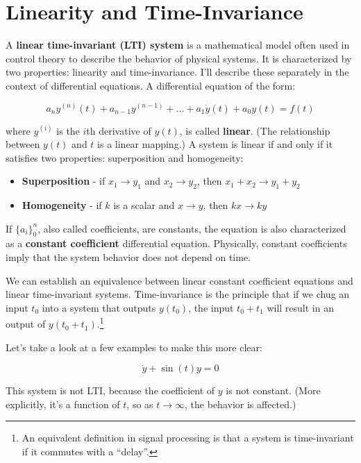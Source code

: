 \documentclass[
  letterpaper,
  DIV=11,
  numbers=noendperiod]{scrreprt}
\providecommand{\tightlist}{%
  \setlength{\itemsep}{0pt}\setlength{\parskip}{0pt}}\usepackage{longtable,booktabs,array}
\begin{document}
\hypertarget{linearity-and-time-invariance}{%
\section{Linearity and
Time-Invariance}\label{linearity-and-time-invariance}}

A \textbf{linear time-invariant (LTI) system} is a mathematical model
often used in control theory to describe the behavior of physical
systems. It is characterized by two properties: linearity and
time-invariance. I'll describe these separately in the context of
differential equations. A differential equation of the form:

\[a_n y^{(n)} (t) + a_{n-1} y^{(n-1)} + ... + a_1 \dot{y}(t) + a_0 y(t) = f(t)\]

where \(y^{(i)}\) is the \(i\)th derivative of \(y(t)\), is called
\textbf{linear}. (The relationship between \(y(t)\) and \(t\) is a
linear mapping.) A system is linear if and only if it satisfies two
properties: superposition and homogeneity:

\begin{itemize}
\tightlist
\item
  \textbf{Superposition} - if \(x_1 \to y_1\) and \(x_2 \to y_2\), then
  \(x_1 + x_2 \to y_1 + y_2\)
\item
  \textbf{Homogeneity} - if \(k\) is a scalar and \(x \to y\), then
  \(kx \to ky\)
\end{itemize}

If \(\{a_i\}_0^n\), also called coefficients, are constants, the
equation is also characterized as a \textbf{constant coefficient}
differential equation. Physically, constant coefficients imply that the
system behavior does not depend on time.

We can establish an equivalence between linear constant coefficient
equations and linear time-invariant systems. Time-invariance is the
principle that if we chug an input \(t_0\) into a system that outputs
\(y(t_0)\), the input \(t_0 + t_1\) will result in an output of
\(y(t_0 + t_1)\).\footnote{An equivalent definition in signal processing
  is that a system is time-invariant if it commutes with a ``delay''.}

Let's take a look at a few examples to make this more clear:

\[\dot{y} + \sin(t) y = 0\]

This system is not LTI, because the coefficient of \(y\) is not
constant. (More explicitly, it's a function of \(t\), so as
\(t \to \infty\), the behavior is affected.)
\end{document}
